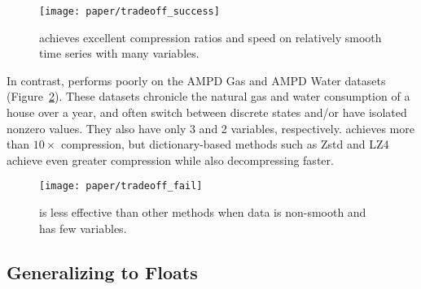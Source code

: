 \begin{figure}[h]
\begin{center}
    \texttt{[image: paper/tradeoff\_success]}
    \caption{\minesp achieves excellent compression ratios and speed on relatively smooth time series with many variables.}
    \label{fig:tradeoff_success}
\end{center}
\end{figure}

In contrast, \minesp performs poorly on the AMPD Gas and AMPD Water datasets (Figure~\ref{fig:tradeoff_failure}). These datasets chronicle the natural gas and water consumption of a house over a year, and often switch between discrete states and/or have isolated nonzero values. They also have only 3 and 2 variables, respectively. \mine achieves more than $10\times$ compression, but dictionary-based methods such as Zstd and LZ4 achieve even greater compression while also decompressing faster.





\begin{figure}[h]
\begin{center}
    \texttt{[image: paper/tradeoff\_fail]}
    \caption{\minesp is less effective than other methods when data is non-smooth and has few variables.}
    \label{fig:tradeoff_failure}
\end{center}
\end{figure}

\subsection{Generalizing to Floats}


